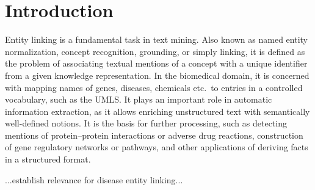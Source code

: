 \documentclass{bioinfo}
\begin{document}
\maketitle

\section{Introduction}

Entity linking is a fundamental task in text mining.
Also known as named entity normalization, concept recognition, grounding, or simply linking, it is defined as the problem of associating textual mentions of a concept with a unique identifier from a given knowledge representation.
In the biomedical domain, it is concerned with mapping names of genes, diseases, chemicals etc.\ to entries in a controlled vocabulary, such as the UMLS.
It plays an important role in automatic information extraction, as it allows enriching unstructured text with semantically well-defined notions.
It is the basis for further processing, such as detecting mentions of protein--protein interactions or adverse drug reactions, construction of gene regulatory networks or pathways, and other applications of deriving facts in a structured format.

...establish relevance for disease entity linking...
\end{document}
